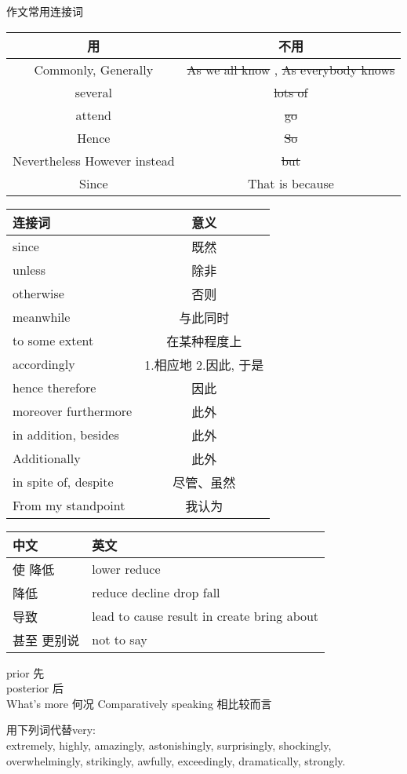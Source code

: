 \documentclass[ignorenonframetext,]{beamer}
\begin{document}
\begin{frame}{作文常用连接词}
\protect\hypertarget{ux4f5cux6587ux5e38ux7528ux8fdeux63a5ux8bcd}{}

\begin{longtable}[]{@{}cc@{}}
\toprule
用 & 不用\tabularnewline
\midrule
\endhead
Commonly, Generally & \sout{As we all know} , \sout{As everybody
knows}\tabularnewline
several & \sout{lots of}\tabularnewline
attend & \sout{go}\tabularnewline
Hence & \sout{So}\tabularnewline
Nevertheless However instead & \sout{but}\tabularnewline
Since & That is because\tabularnewline
\bottomrule
\end{longtable}

\end{frame}

\begin{frame}

\begin{longtable}[]{@{}lc@{}}
\toprule
连接词 & 意义\tabularnewline
\midrule
\endhead
since & 既然\tabularnewline
unless & 除非\tabularnewline
otherwise & 否则\tabularnewline
meanwhile & 与此同时\tabularnewline
to some extent & 在某种程度上\tabularnewline
accordingly & 1.相应地 2.因此, 于是\tabularnewline
hence therefore & 因此\tabularnewline
moreover furthermore & 此外\tabularnewline
in addition, besides & 此外\tabularnewline
Additionally & 此外\tabularnewline
in spite of, despite & 尽管、虽然\tabularnewline
From my standpoint & 我认为\tabularnewline
\bottomrule
\end{longtable}

\end{frame}

\begin{frame}

\begin{longtable}[]{@{}ll@{}}
\toprule
中文 & 英文\tabularnewline
\midrule
\endhead
使 降低 & lower reduce\tabularnewline
降低 & reduce decline drop fall\tabularnewline
导致 & lead to cause result in create bring about\tabularnewline
甚至 更别说 & not to say\tabularnewline
\bottomrule
\end{longtable}

prior 先\\
posterior 后\\
What's more 何况 Comparatively speaking 相比较而言

用下列词代替very:\\
extremely, highly, amazingly, astonishingly, surprisingly, shockingly,
overwhelmingly, strikingly, awfully, exceedingly, dramatically,
strongly.

\end{frame}
\end{document}
